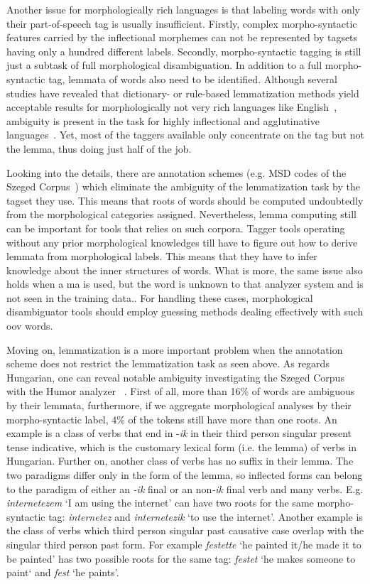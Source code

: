 Another issue for morphologically rich languages is that labeling words with only their part-of-speech tag is usually insufficient. 
Firstly, complex morpho-syntactic features carried by the inflectional morphemes can not be represented by tagsets having only a hundred different labels. 
Secondly, morpho-syntactic tagging is still just a subtask of full morphological disambiguation. 
In addition to a full morpho-syntactic tag, lemmata of words also need to be identified. Although several studies have revealed that dictionary- or rule-based lemmatization methods yield acceptable results for morphologically not very rich languages like English~\cite{Porter1980,Plisson2004}, ambiguity is present in the task for highly inflectional and agglutinative languages~\cite{Jursic2007,Sak2007,Chrupaa2008}. 
Yet, most of the taggers available only concentrate on the tag but not the lemma, thus doing just half of the job.

Looking into the details, there are annotation schemes (e.g. MSD codes of the Szeged Corpus~\cite{Csendes2004}) which eliminate the ambiguity of the lemmatization task by the tagset they use.
This means that roots of words should be computed undoubtedly from the morphological categories assigned.
Nevertheless, lemma computing still can be important for tools that relies on such corpora.
Tagger tools operating without any prior morphological knowledges till  have to figure out how to derive lemmata from morphological labels.
This means that they have to infer knowledge about the inner structures of words.
What is more, the same issue also holds when a \acrshort{ma} is used, but the word is unknown to that analyzer system and is not seen in the training data..
For handling these cases, morphological disambiguator tools should employ guessing methods dealing effectively with such \acrlong{oov} words.

Moving on, lemmatization is a more important problem when the annotation scheme does not restrict the lemmatization task as seen above.
As regards Hungarian, one can reveal notable ambiguity investigating the Szeged Corpus~\cite{Csendes2004} with the Humor analyzer ~\cite{Proszeky1994,Novak2003,Proszeky2005}. 
First of all, more than 16\% of words are ambiguous by their lemmata, furthermore, if we aggregate morphological analyses by their morpho-syntactic label, 4\% of the tokens still have more than one roots. 
An example is a class of verbs that end in -\emph{ik} in their third person singular present tense indicative, which is the customary lexical form (i.e. the lemma) of verbs in Hungarian. Further on, another class of verbs has no suffix in their lemma. 
The two paradigms differ only in the form of the lemma, so inflected forms can belong to the paradigm of either an \emph{-ik} final or an non\emph{-ik} final verb and many verbs. 
E.g. \emph{internetezem} `I am using the internet' can have two roots for the same morpho-syntactic tag: \emph{internetez} and \emph{internetezik} `to use the internet'.
Another example is the class of verbs which third person singular past causative case overlap with the singular third person past form. 
For example \emph{festette} `he painted it/he made it to be painted' has two possible roots for the same tag: \emph{festet} `he makes someone to paint` and \emph{fest} `he paints'. 

